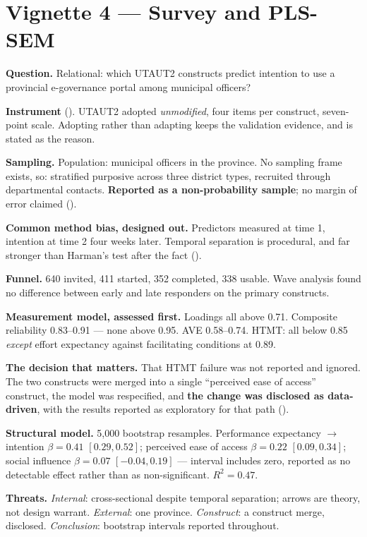 \section{Vignette 4 --- Survey and PLS-SEM}

\begin{vignette}
\textbf{Question.} Relational: which UTAUT2 constructs predict intention to use
a provincial e-governance portal among municipal officers?

\medskip
\textbf{Instrument} (). UTAUT2 adopted \emph{unmodified}, four
items per construct, seven-point scale. Adopting rather than adapting keeps the
validation evidence, and is stated as the reason.

\medskip
\textbf{Sampling.} Population: municipal officers in the province. No sampling
frame exists, so: stratified purposive across three district types, recruited
through departmental contacts. \textbf{Reported as a non-probability sample};
no margin of error claimed ().

\medskip
\textbf{Common method bias, designed out.} Predictors measured at time 1,
intention at time 2 four weeks later. Temporal separation is procedural, and
far stronger than Harman's test after the fact ().

\medskip
\textbf{Funnel.} 640 invited, 411 started, 352 completed, 338 usable. Wave
analysis found no difference between early and late responders on the primary
constructs.

\medskip
\textbf{Measurement model, assessed first.} Loadings all above 0.71. Composite
reliability 0.83--0.91 --- none above 0.95. AVE 0.58--0.74. HTMT: all below
0.85 \emph{except} effort expectancy against facilitating conditions at 0.89.

\medskip
\textbf{The decision that matters.} That HTMT failure was not reported and
ignored. The two constructs were merged into a single ``perceived ease of
access'' construct, the model was respecified, and \textbf{the change was
disclosed as data-driven}, with the results reported as exploratory for that
path ().

\medskip
\textbf{Structural model.} 5,000 bootstrap resamples. Performance expectancy
$\rightarrow$ intention $\beta = 0.41$ $[0.29, 0.52]$; perceived ease of access
$\beta = 0.22$ $[0.09, 0.34]$; social influence $\beta = 0.07$ $[-0.04, 0.19]$
--- interval includes zero, reported as no detectable effect rather than as
non-significant. $R^2 = 0.47$.

\medskip
\textbf{Threats.} \emph{Internal}: cross-sectional despite temporal separation;
arrows are theory, not design warrant. \emph{External}: one province.
\emph{Construct}: a construct merge, disclosed. \emph{Conclusion}: bootstrap
intervals reported throughout.
\end{vignette}

